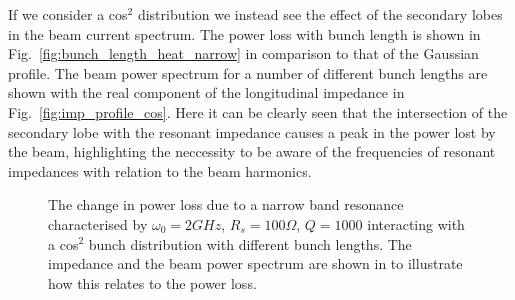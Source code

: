\documentclass{cernyrep}
\begin{document}
If we consider a cos$^{2}$ distribution we instead see the effect of the secondary lobes in the beam current spectrum. The power loss with bunch length is shown in Fig.~\ref{fig:bunch_length_heat_narrow} in comparison to that of the Gaussian profile. The beam power spectrum for a number of different bunch lengths are shown with the real component of the longitudinal impedance in Fig.~\ref{fig:imp_profile_cos}. Here it can be clearly seen that the intersection of the secondary lobe with the resonant impedance causes a peak in the power lost by the beam, highlighting the neccessity to be aware of the frequencies of resonant impedances with relation to the beam harmonics.


\begin{figure}
\caption{ The change in power loss due to a narrow band resonance characterised by $\omega_{0} = 2GHz$, $R_{s} = 100\Omega$, $Q = 1000$ interacting with a cos$^{2}$ bunch distribution with different bunch lengths. The impedance and the beam power spectrum are shown in  to illustrate how this relates to the power loss.}
\end{figure}
\end{document}
